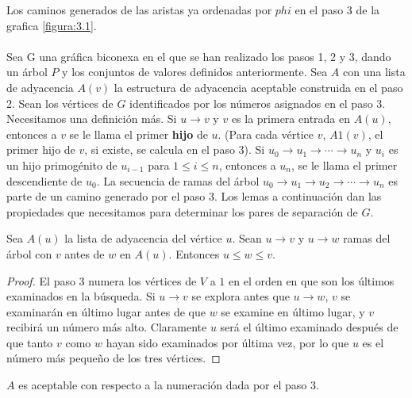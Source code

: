 Los caminos generados de las aristas ya ordenadas por $phi$ en el paso 3 de la grafica \ref{figura:3.1}.

\paragraph{}
Sea G una gráfica biconexa en el que se han realizado los pasos 1, 2 y 3, dando un árbol $P$ y los conjuntos de valores definidos anteriormente. Sea $A$ con una lista de adyacencia $A\left(v\right)$ la estructura de adyacencia aceptable construida en el paso 2. Sean los vértices de $G$ identificados por los números asignados en el paso 3. Necesitamos una definición más. Si $u \rightarrow v$ y $v$ es la primera entrada en $A\left(u\right)$, entonces a $v$ se le llama el primer \textbf{hijo} de $u$. (Para cada vértice $v$, $A1\left(v\right)$, el primer hijo de $v$, si existe, se calcula en el paso 3). Si $u_{0} \rightarrow u_{1} \rightarrow \cdots \rightarrow u_{n}$ y $u_{i}$ es un hijo primogénito de $u_{i-1}$ para $1 \leq i \leq n$, entonces a $u_{n}$, se le llama el primer descendiente de $u_{0}$. La secuencia de ramas del árbol $u_{0} \rightarrow u_{1} \rightarrow u_{2} \rightarrow \cdots \rightarrow u_{n}$ es parte de un camino generado por el paso 3. Los lemas a continuación dan las propiedades que necesitamos para determinar los pares de separación de $G$.

\begin{lemma}
Sea $A\left(u\right)$ la lista de adyacencia del vértice $u$. Sean $u \rightarrow v$ y $u \rightarrow w$ ramas del árbol con $v$ antes de $w$ en $A\left(u\right)$. Entonces $u \le w \le v$.
\label{lema:3.9}
\end{lemma}

\begin{proof}
El paso 3 numera los vértices de $V$ a $1$ en el orden en que son los últimos examinados en la búsqueda. Si $u \rightarrow v$ se explora antes que $u \rightarrow w$, $v$ se examinarán en último lugar antes de que $w$ se examine en último lugar, y $v$ recibirá un número más alto. Claramente $u$ será el último examinado después de que tanto $v$ como $w$ hayan sido examinados por última vez, por lo que $u$ es el número más pequeño de los tres vértices.
\end{proof}

\begin{lemma}
$A$ es aceptable con respecto a la numeración dada por el paso 3.
\label{3.10}
\end{lemma}

